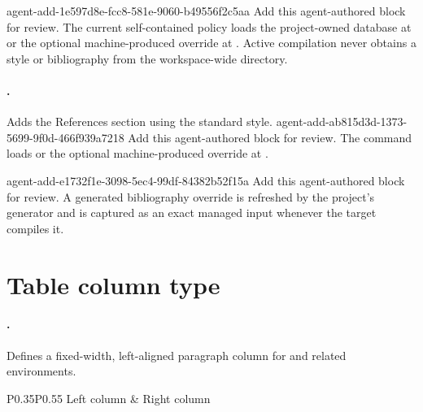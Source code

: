 \agentProposedEdit
  {agent-add-1e597d8e-fcc8-581e-9060-b49556f2c5aa}
  {Add this agent-authored block for review.}
  {}
  {The current self-contained policy loads the project-owned database at  or the optional machine-produced override at .
Active compilation never obtains a style or bibliography from the workspace-wide  directory.}
\paragraph{\code{\manualBibliography}.}
Adds the References section using the standard  style.
\agentProposedEdit
  {agent-add-ab815d3d-1373-5699-9f0d-466f939a7218}
  {Add this agent-authored block for review.}
  {}
  {The command loads  or the optional machine-produced override at .}

\begin{DocCode}
\manualBibliography
\end{DocCode}

\agentProposedEdit
  {agent-add-e1732f1e-3098-5ec4-99df-84382b52f15a}
  {Add this agent-authored block for review.}
  {}
  {A generated bibliography override is refreshed by the project's generator and is captured as an exact managed input whenever the target compiles it.}

\section*{Table column type}

\paragraph{.}
Defines a fixed-width, left-aligned paragraph column for  and related environments.

\begin{DocCode}
\begin{tabular}{P{0.35\textwidth}P{0.55\textwidth}}
Left column & Right column \\
\end{tabular}
\end{DocCode}


